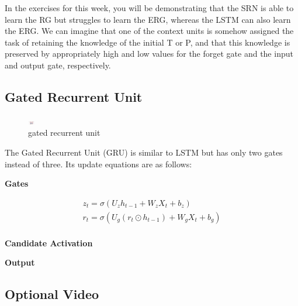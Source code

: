 \documentclass[11pt]{article}
\begin{document}
In the exercises for this week, you will be demonstrating that the SRN is able to learn the RG but struggles to learn the ERG, whereas the LSTM can also learn the ERG. We can imagine that one of the context units is somehow assigned the task of retaining the knowledge of the initial T or P, and that this knowledge is preserved by appropriately high and low values for the forget gate and the input and output gate, respectively.

\subsection{Gated Recurrent Unit}\label{subsec:gated-recurrent-unit}

\begin{figure}[h]
    \centering
    \includegraphics[height=6,width=12]{../out/images/gated-recurrent-unit}
    \caption[gated recurrent unit]{gated recurrent unit}
    \label{fig: gated recurrent unit}
\end{figure}

The Gated Recurrent Unit (GRU) is similar to LSTM but has only two gates instead of three.
Its update equations are as follows:

\textbf{Gates}

\begin{gather*}
    z_t = \sigma (U_{z}h_{t-1} + W_{z}X_t + b_z)\\
    r_t = \sigma (U_g(r_t \odot h_{t-1}) + W_g X_{t} + b_g)\\
\end{gather*}

\textbf{Candidate Activation}

\textbf{Output}

\subsection{Optional Video}\label{subsec:optional-video}
\end{document}
